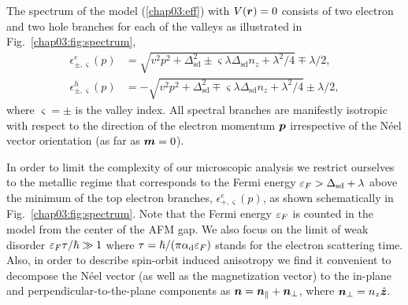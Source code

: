 The spectrum of the model (\ref{chap03:eff}) with $V(\boldsymbol{r})=0$ consists of two electron and two hole branches for each of the valleys as illustrated in Fig.~\ref{chap03:fig:spectrum},
\beml
\label{chap03:spectrum}
\begin{align}
\label{chap03:spectrume}
\epsilon^e_{\pm,\varsigma}(p)&=\sqrt{v^2p^2+\Delta_{\text{sd}}^2\pm \varsigma\lambda\Delta_{\text{sd}} n_z+\lambda^2/4} \mp \lambda/2,\\
\epsilon^h_{\pm,\varsigma}(p)&=-\sqrt{v^2p^2+\Delta_{\text{sd}}^2\mp \varsigma\lambda\Delta_{\text{sd}} n_z+\lambda^2/4} \pm \lambda/2,
\end{align}
\eml
where $\varsigma=\pm$ is the valley index. All spectral branches are manifestly isotropic with respect to the direction of the electron momentum $\boldsymbol{p}$ irrespective of the N\'eel vector orientation (as far as $\boldsymbol{m}=0$). 

In order to limit the complexity of our microscopic analysis we restrict ourselves to the metallic regime that corresponds to the Fermi energy $\varepsilon_F > \Delta_{\text{sd}}+\lambda$ above the minimum of the top electron branches, $\epsilon^e_{+,\varsigma}(p)$, as shown schematically in Fig.~\ref{chap03:fig:spectrum}. Note that the Fermi energy $\varepsilon_F$ is counted in the model from the center of the AFM gap. 
We also focus on the limit of weak disorder $\varepsilon_F \tau/\hslash\gg 1$ where $\tau = \hslash/(\pi\alpha_\textrm{d}\varepsilon_F)$ stands for the electron scattering time. Also, in order to describe spin-orbit induced anisotropy we find it convenient to decompose the N\'eel vector (as well as the magnetization vector) to the in-plane and perpendicular-to-the-plane components as $\boldsymbol{n}= \boldsymbol{n}_\parallel+\boldsymbol{n}_\perp$, where $\boldsymbol{n}_\perp=n_z\hat{\boldsymbol{z}}$. 

